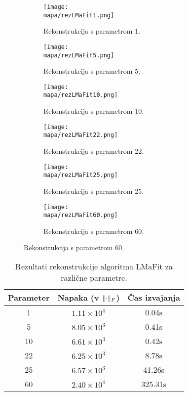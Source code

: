 \renewcommand{\mapa}{Poglavja/Slike/informacija ranga}

\begin{figure}[!ht]
    \begin{subfigure}{0.325\linewidth}
        \texttt{[image: \\mapa/rezLMaFit1.png]}
        \caption{Rekonstrukcija s parametrom 1.}
    \end{subfigure}
    \hfill
    \begin{subfigure}{0.325\linewidth}
        \texttt{[image: \\mapa/rezLMaFit5.png]}
        \caption{Rekonstrukcija s parametrom 5.}
    \end{subfigure}
    \hfill
    \begin{subfigure}{0.325\linewidth}
        \texttt{[image: \\mapa/rezLMaFit10.png]}
        \caption{Rekonstrukcija s parametrom 10.}
    \end{subfigure}

    \begin{subfigure}{0.325\linewidth}
        \texttt{[image: \\mapa/rezLMaFit22.png]}
        \caption{Rekonstrukcija s parametrom 22.}
    \end{subfigure}
    \hfill
    \begin{subfigure}{0.325\linewidth}
        \texttt{[image: \\mapa/rezLMaFit25.png]}
        \caption{Rekonstrukcija s parametrom 25.}
    \end{subfigure}
    \hfill
    \begin{subfigure}{0.325\linewidth}
        \texttt{[image: \\mapa/rezLMaFit60.png]}
        \caption{Rekonstrukcija s parametrom 60.}
    \end{subfigure}
\end{figure}

\begin{table}[h]
    \centering
    \begin{tabular}{|c|c|c|}
        \hline
        Parameter & Napaka (v $\lVert\cdot\rVert_F$)& Čas izvajanja \\
        \hline
        1         & $1.11 \times 10^4$ & 0.04s        \\
        5         & $8.05 \times 10^3$ & 0.41s         \\
        10        & $6.61 \times 10^3$ & 0.42s        \\
        22        & $6.25 \times 10^3$ & 8.78s       \\
        25        & $6.57 \times 10^3$ & 41.26s        \\
        60        & $2.40 \times 10^4$ & 325.31s        \\
        \hline
    \end{tabular}
    \caption{Rezultati rekonstrukcije algoritma LMaFit za različne parametre.}
\end{table}